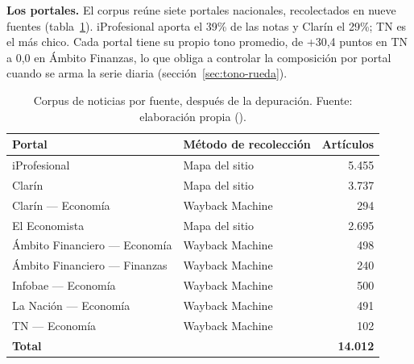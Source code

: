 \textbf{Los portales.} El corpus reúne siete portales nacionales, recolectados en nueve
fuentes (tabla~\ref{tab:corpus}). iProfesional aporta el 39\% de las notas y Clarín el 29\%;
TN es el más chico. Cada portal tiene su propio tono promedio, de +30,4 puntos en TN a 0,0 en
Ámbito Finanzas, lo que obliga a controlar la composición por portal cuando se arma la serie
diaria (sección~\ref{sec:tono-rueda}).

\begin{table}[H]
\centering\small
\begin{tabular}{@{}llr@{}}
\toprule
\textbf{Portal} & \textbf{Método de recolección} & \textbf{Artículos} \\
\midrule
iProfesional & Mapa del sitio & 5.455 \\
Clarín & Mapa del sitio & 3.737 \\
Clarín — Economía & Wayback Machine & 294 \\
El Economista & Mapa del sitio & 2.695 \\
Ámbito Financiero — Economía & Wayback Machine & 498 \\
Ámbito Financiero — Finanzas & Wayback Machine & 240 \\
Infobae — Economía & Wayback Machine & 500 \\
La Nación — Economía & Wayback Machine & 491 \\
TN — Economía & Wayback Machine & 102 \\
\midrule
\textbf{Total} & & \textbf{14.012} \\
\bottomrule
\end{tabular}
\caption{Corpus de noticias por fuente, después de la depuración. Fuente: elaboración propia
().}
\label{tab:corpus}
\end{table}
